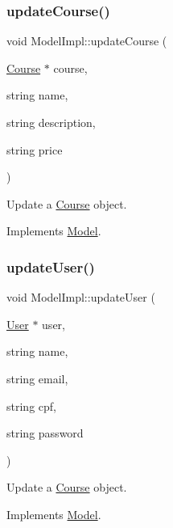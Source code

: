\subsubsection{\texorpdfstring{update\+Course()}{updateCourse()}}
{\footnotesize\ttfamily void Model\+Impl\+::update\+Course (\begin{DoxyParamCaption}\item[{\hyperlink{classCourse}{Course} $\ast$}]{course,  }\item[{string}]{name,  }\item[{string}]{description,  }\item[{string}]{price }\end{DoxyParamCaption})\hspace{0.3cm}{\ttfamily [virtual]}}



Update a \hyperlink{classCourse}{Course} object. 



Implements \hyperlink{classModel_aa3ea9c92f586cec1944e3dcdee8c0672}{Model}.

\mbox{\label{classModelImpl_a8088106fd8837da688f9334ab143db4c}} 
\subsubsection{\texorpdfstring{update\+User()}{updateUser()}}
{\footnotesize\ttfamily void Model\+Impl\+::update\+User (\begin{DoxyParamCaption}\item[{\hyperlink{classUser}{User} $\ast$}]{user,  }\item[{string}]{name,  }\item[{string}]{email,  }\item[{string}]{cpf,  }\item[{string}]{password }\end{DoxyParamCaption})\hspace{0.3cm}{\ttfamily [virtual]}}



Update a \hyperlink{classCourse}{Course} object. 



Implements \hyperlink{classModel_a83ebd4a5678c31c8dd46155d34df961d}{Model}.

\mbox{\label{classModelImpl_a6ce3d79c0b49abe19c034dfb30d023d7}} 
